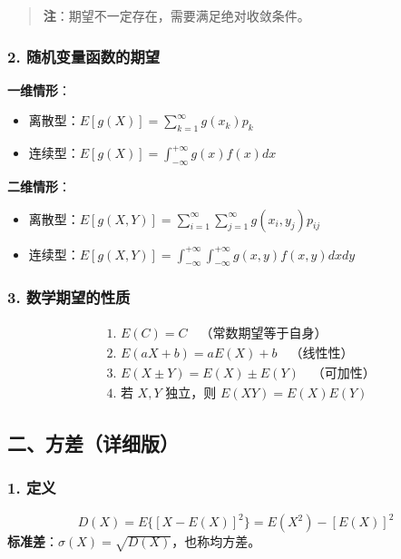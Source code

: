 \documentclass[12pt,a4paper]{ctexart}
\newenvironment{myquote}
  {\par\vspace{0.5em}\begin{quote}\sffamily\color{gray}}
  {\end{quote}\vspace{0.5em}}
\begin{document}
\begin{myquote}
    \textbf{注}：期望不一定存在，需要满足绝对收敛条件。
\end{myquote}

\subsubsection{2. 随机变量函数的期望}
\textbf{一维情形}：
\begin{itemize}[noitemsep]
    \item 离散型：$\displaystyle E[g(X)] = \sum_{k=1}^\infty g(x_k) p_k$
    \item 连续型：$\displaystyle E[g(X)] = \int_{-\infty}^{+\infty} g(x) f(x) dx$
\end{itemize}

\textbf{二维情形}：
\begin{itemize}[noitemsep]
    \item 离散型：$\displaystyle E[g(X, Y)] = \sum_{i=1}^\infty \sum_{j=1}^\infty g(x_i, y_j) p_{ij}$
    \item 连续型：$\displaystyle E[g(X, Y)] = \int_{-\infty}^{+\infty} \int_{-\infty}^{+\infty} g(x, y) f(x, y) dx dy$
\end{itemize}

\subsubsection{3. 数学期望的性质}
\begin{align*}
     & \text{1. } E(C) = C \quad\text{（常数期望等于自身）}              \\
     & \text{2. } E(aX + b) = aE(X) + b \quad\text{（线性性）}      \\
     & \text{3. } E(X \pm Y) = E(X) \pm E(Y) \quad\text{（可加性）} \\
     & \text{4. 若 } X, Y \text{ 独立，则 } E(XY) = E(X)E(Y)
\end{align*}

\subsection{二、方差（详细版）}

\subsubsection{1. 定义}
\[
    D(X) = E\{[X - E(X)]^2\} = E(X^2) - [E(X)]^2
\]
\textbf{标准差}：$\sigma(X) = \sqrt{D(X)}$，也称均方差。
\end{document}
